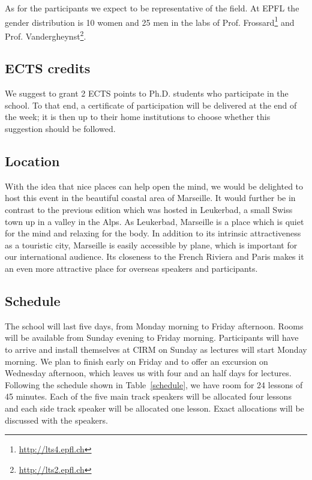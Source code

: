 \documentclass[a4paper]{scrartcl}
\begin{document}
As for the participants we expect to be representative of the field. At EPFL the
gender distribution is 10 women and 25 men in the labs of Prof.
Frossard\footnote{\url{http://lts4.epfl.ch}} and Prof.
Vandergheynst\footnote{\url{http://lts2.epfl.ch}}.

\subsection{ECTS credits}

We suggest to grant 2 ECTS points to Ph.D. students who participate in the
school. To that end, a certificate of participation will be delivered at the end
of the week; it is then up to their home institutions to choose whether this
suggestion should be followed.

\subsection{Location}

With the idea that nice places can help open the mind, we would be delighted to
host this event in the beautiful coastal area of Marseille. It would further be
in contrast to the previous edition which was hosted in Leukerbad, a small Swiss
town up in a valley in the Alps. As Leukerbad, Marseille is a place which is
quiet for the mind and relaxing for the body. 
In addition to its intrinsic attractiveness as a touristic city, Marseille is
easily accessible by plane, which is important for our international audience.
Its closeness to the French Riviera and Paris makes it an even more attractive
place for overseas speakers and participants.

\subsection{Schedule}

The school will last five days, from Monday morning to Friday afternoon. Rooms
will be available from Sunday evening to Friday morning. Participants will have
to arrive and install themselves at CIRM on Sunday as lectures will start Monday
morning. We plan to finish early on Friday and to offer an excursion on
Wednesday afternoon, which leaves us with four and an half days for lectures.
Following the schedule shown in Table~\ref{schedule}, we have room for 24
lessons of 45 minutes. Each of the five main track speakers will be allocated
four lessons and each side track speaker will be allocated one lesson.
Exact allocations will be discussed with the speakers.
\end{document}
